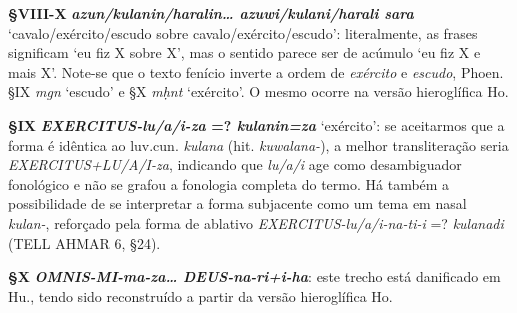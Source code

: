 \smallskip
\noindent\textbf{§VIII-X}\tabto{4em}
\textbf{\emph{azun\slash{}kulanin\slash{}haralin\ldots{} azuwi\slash{}kulani\slash{}harali sara}}
`cavalo\slash{}exér\-ci\-to\slash{}escudo sobre cavalo\slash{}exército\slash{}escudo':
literalmente, as frases significam `eu fiz X sobre X', mas o sentido parece ser
de acúmulo `eu fiz X e mais X'.
Note-se que o texto fenício inverte a ordem de \emph{exército} e \emph{escudo},
Phoen. §IX \emph{mgn} `escudo' e §X \emph{mḥnt} `exército'.
O mesmo ocorre na versão hieroglífica Ho.

\smallskip
\noindent\textbf{§IX}\tabto{2em}
\textbf{\emph{\emph{EXERCITUS}-lu/a/i-za} {=?} \emph{kulanin=za}} `exército': se
aceitarmos que a for\-ma é idêntica ao luv.cun. \emph{kulana} (hit.
\emph{kuwalana-}), a melhor transliteração seria
\emph{\emph{EXERCITUS}+LU/A/I-za}, indicando que \emph{lu/a/i} age como
desambiguador fonológico e não se grafou a fonologia completa do termo.
Há também a possibilidade de se interpretar a forma subjacente como um tema em
nasal \emph{kulan-}, reforçado pela forma de ablativo
\emph{\emph{EXERCITUS}-lu/a/i-na-ti-i} {=?} \emph{kulanadi} (TELL AHMAR 6,
§24).

\smallskip
\noindent\textbf{§X}\tabto{2em}
\textbf{\emph{\emph{OMNIS}-MI-ma-za\ldots{} \emph{DEUS}-na-ri+i-ha}}: este trecho
está danificado em Hu., tendo sido reconstruído a partir da versão hieroglífica Ho.

